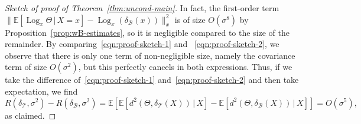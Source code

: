 \documentclass[10pt,a4paper]{amsart}
\DeclareMathOperator{\Log}{Log}
\newcommand{\B}{\mathcal{B}}
\newcommand{\Ebb}{\mathbb{E}}
\newcommand{\T}{\mathcal{T}}
\begin{document}
\begin{proof}[Sketch of proof of Theorem~\ref{thm:uncond-main}]
    In fact, the first-order term $\|\Ebb[\Log_x\Theta\,|\,X=x]-\Log_x(\delta_{\B}(x)) \|_x^2$ is of size $O(\sigma^8)$ by Proposition~\ref{prop:wB-estimates}, so it is negligible compared to the size of the remainder.
    By comparing~\eqref{eqn:proof-sketch-1} and ~\eqref{eqn:proof-sketch-2}, we observe that there is only one term of non-negligible size, namely the covariance term  of size $O(\sigma^2)$, but this perfectly cancels in both expressions.
    Thus, if we take the difference of~\eqref{eqn:proof-sketch-1} and~\eqref{eqn:proof-sketch-2} and then take expectation, we find
    \begin{equation*}
        R(\delta_{\T},\sigma^2) - R(\delta_{\B},\sigma^2) = \Ebb[\Ebb[d^2(\Theta,\delta_{\T}(X))\,|\,X] - \Ebb[d^2(\Theta,\delta_{\B}(X))\,|\,X]] = O(\sigma^5),
    \end{equation*}
    as claimed.
\end{proof}
\end{document}
